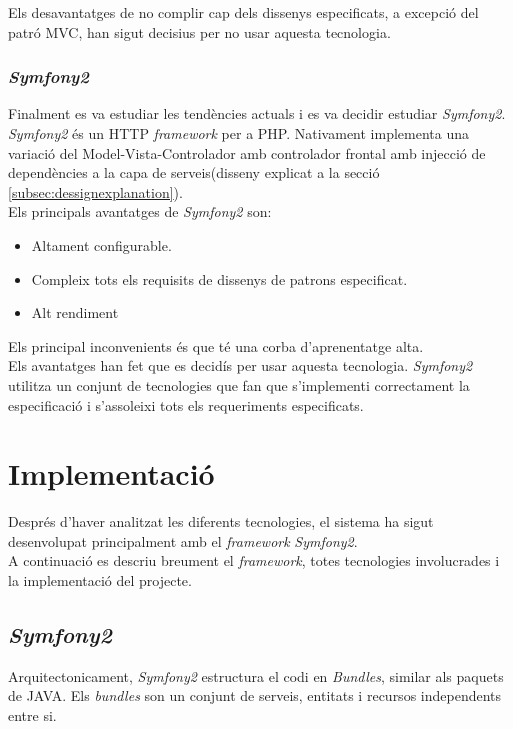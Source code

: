 Els desavantatges de no complir cap dels dissenys especificats, a excepció del patró MVC, han sigut decisius per no usar aquesta tecnologia.

\subsubsection{\textit{Symfony2}}
Finalment es va estudiar les tendències actuals i es va decidir estudiar \textit{Symfony2}.\cite{symfony} \textit{Symfony2} \'{e}s un HTTP \textit{framework} per a PHP. Nativament implementa una variaci\'{o} del Model-Vista-Controlador amb controlador frontal amb injecci\'{o} de dependències a la capa de serveis(disseny explicat a la secció \ref{subsec:dessignexplanation}).\\

Els principals avantatges de \textit{Symfony2} son:
\begin{itemize}
\item Altament configurable.
\item Compleix tots els requisits de dissenys de patrons especificat.
\item Alt rendiment
\end{itemize}

Els principal inconvenients \'{e}s que t\'{e} una corba d'aprenentatge alta.\\

Els avantatges han fet que es decidís per usar aquesta tecnologia. \textit{Symfony2} utilitza un conjunt de tecnologies que fan que s'implementi correctament la especificació i s'assoleixi tots els requeriments especificats.\\

\section{Implementaci\'{o}}
Després d'haver analitzat les diferents tecnologies, el sistema ha sigut desenvolupat principalment amb el \textit{framework} \textit{Symfony2}.\\

A continuació es descriu breument el \textit{framework}, totes tecnologies involucrades i la implementació del projecte.

\subsection{\textit{Symfony2}}
Arquitectonicament, \textit{Symfony2} estructura el codi en \textit{Bundles}, similar als paquets de JAVA. Els \textit{bundles} son un conjunt de serveis, entitats i recursos independents entre si.\\

